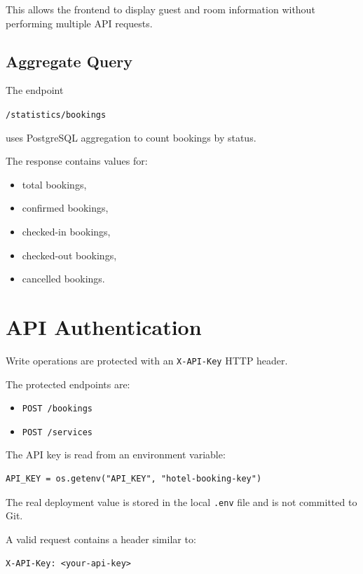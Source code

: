 \documentclass[12pt,a4paper]{article}
\begin{document}
This allows the frontend to display guest and room information without
performing multiple API requests.

\subsection{Aggregate Query}

The endpoint

\begin{center}
\texttt{/statistics/bookings}
\end{center}

uses PostgreSQL aggregation to count bookings by status.

The response contains values for:

\begin{itemize}
    \item total bookings,
    \item confirmed bookings,
    \item checked-in bookings,
    \item checked-out bookings,
    \item cancelled bookings.
\end{itemize}

\section{API Authentication}

Write operations are protected with an \texttt{X-API-Key} HTTP header.

The protected endpoints are:

\begin{itemize}
    \item \texttt{POST /bookings}
    \item \texttt{POST /services}
\end{itemize}

The API key is read from an environment variable:

\begin{lstlisting}
API_KEY = os.getenv("API_KEY", "hotel-booking-key")
\end{lstlisting}

The real deployment value is stored in the local \texttt{.env} file and
is not committed to Git.

A valid request contains a header similar to:

\begin{lstlisting}
X-API-Key: <your-api-key>
\end{lstlisting}
\end{document}
